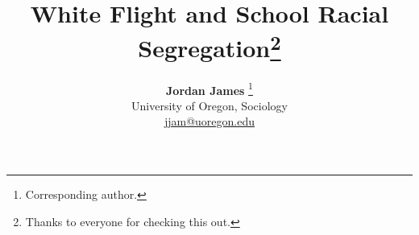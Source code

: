 \documentclass[
  12pt,
  letterpaper,
]{article}
\title{White Flight and School Racial Segregation\thanks{Thanks to
everyone for checking this out.}}
\author{
{\bfseries \normalsize Jordan James}%
\thanks{Corresponding author.} \\%
 \small University of Oregon, Sociology \\%
{\footnotesize \url{jjam@uoregon.edu}} \\\vspace{10pt}
}
\date{}
\newenvironment{keywords}
{\small\sffamily{\sffamily\small\bfseries{Keywords.}}}
\begin{document}
\renewcommand{\abstractname}{Abstract.}


\maketitle
\begin{abstract}
An Abstract
\end{abstract}
\begin{keywords}
\def\sep{;\ }
segregation\sep 
white flight
\end{keywords}

\section{Introduction}\label{introduction}

Despite racially segregated schools being considered unconstitutional
since the Supreme Court decision of Brown v. Board 1954, the education
system in the U.S.is still heavily racially segregated. White flight is
a phenomena that describes the pattern of a large amount of white
families leaving urban areas into suburban areas. Typically, white
families have the socioeconomic resources to be able to move
middle-class or upper middle-class suburban areas. White families also
have negative expectations of Black and Hispanic schools, and decide not
to send their children there. In other words, White families prefer to
send their children to white schools, to avoid the negative stereotypes
that they believe exist in Black and Hispanic schools. With the
existence of private schools and the socioeconomic resources that white
families have, they are able to enroll their children in private
schools, without necessarily needing to move to a different city or
neighborhood.

This project looks at the relationship between the racial segregation of
private schools and public schools. The research question is does the
(n) amount of private schools correlate to the increase in racially
segregated schools by school district in the U.S.? I'm interested in
looking at if there are less private schools for white families to
access, will there be less racially segregated public schools?

My unit of analysis would be school districts because they follow city
lines and not county lines. Cities can have multiple school districts as
well, why I'm not looking just at cities. The outcome or dependent
variable would be levels of segregation (if a population is
majority-BIPOC or majority-white) and the independent variable would be
the number of private schools in a city.
\end{document}
